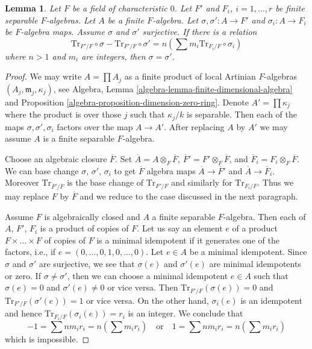 \documentclass{stacks-project}
\theoremstyle{plain}
\newtheorem{lemma}[subsection]{Lemma}
\theoremstyle{definition}
\theoremstyle{remark}
\numberwithin{equation}{subsection}
\begin{document}
\begin{lemma}
\label{lemma-algebra-relations}
Let $F$ be a field of characteristic $0$.
Let $F'$ and $F_i$, $i = 1, \ldots, r$
be finite separable $F$-algebras. Let $A$ be a finite $F$-algebra.
Let $\sigma, \sigma' : A \to F'$ and $\sigma_i : A \to F_i$
be $F$-algebra maps. Assume $\sigma$ and $\sigma'$ surjective.
If there is a relation
$$
\text{Tr}_{F'/F} \circ \sigma - \text{Tr}_{F'/F} \circ \sigma' =
n(\sum m_i \text{Tr}_{F_i/F} \circ \sigma_i)
$$
where $n > 1$ and $m_i$ are integers, then $\sigma = \sigma'$.
\end{lemma}

\begin{proof}
We may write $A = \prod A_j$ as a finite product of
local Artinian $F$-algebras $(A_j, \mathfrak m_j, \kappa_j)$, see
Algebra, Lemma \ref{algebra-lemma-finite-dimensional-algebra} and
Proposition \ref{algebra-proposition-dimension-zero-ring}.
Denote $A' = \prod \kappa_j$ where the product is over those $j$
such that $\kappa_j/k$ is separable. Then each of the maps
$\sigma, \sigma', \sigma_i$ factors over the map
$A \to A'$. After replacing $A$ by $A'$ we may assume
$A$ is a finite separable $F$-algebra.

\medskip\noindent
Choose an algebraic closure $\overline{F}$. Set
$\overline{A} = A \otimes_F \overline{F}$,
$\overline{F}' = F' \otimes_F \overline{F}$, and
$\overline{F}_i = F_i \otimes_F \overline{F}$.
We can base change $\sigma$, $\sigma'$, $\sigma_i$
to get $\overline{F}$ algebra maps $\overline{A} \to \overline{F}'$
and $\overline{A} \to \overline{F}_i$. Moreover
$\text{Tr}_{\overline{F}'/\overline{F}}$ is the base
change of $\text{Tr}_{F'/F}$ and similarly for
$\text{Tr}_{F_i/F}$. Thus we may replace
$F$ by $\overline{F}$ and we reduce to the case discussed in
the next paragraph.

\medskip\noindent
Assume $F$ is algebraically closed and $A$ a finite separable $F$-algebra.
Then each of $A$, $F'$, $F_i$ is a product of copies of $F$.
Let us say an element $e$ of a product
$F \times \ldots \times F$ of copies of $F$ is a minimal idempotent
if it generates one of the factors, i.e., if
$e = (0, \ldots, 0, 1, 0, \ldots, 0)$. Let $e \in A$ be a minimal idempotent.
Since $\sigma$ and $\sigma'$ 
are surjective, we see that $\sigma(e)$ and $\sigma'(e)$ are minimal
idempotents or zero. If $\sigma \not = \sigma'$, then we can choose
a minimal idempotent $e \in A$ such that $\sigma(e) = 0$ and
$\sigma'(e) \not = 0$ or vice versa. Then
$\text{Tr}_{F'/F}(\sigma(e)) = 0$ and
$\text{Tr}_{F'/F}(\sigma'(e)) = 1$ or vice versa.
On the other hand, $\sigma_i(e)$ is an idempotent
and hence $\text{Tr}_{F_i/F}(\sigma_i(e)) = r_i$ is an integer.
We conclude that
$$
-1 = \sum n m_i r_i = n (\sum m_i r_i)
\quad\text{or}\quad
1 = \sum n m_i r_i = n (\sum m_i r_i)
$$
which is impossible.
\end{proof}
\end{document}
